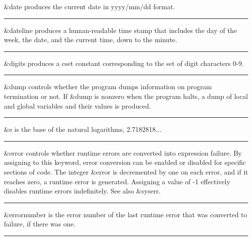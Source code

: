 \noindent
{}\textsf{\&date} produces the current
date in yyyy/mm/dd format.

\bigskip\hrule\vspace{0.1cm}

\noindent
{}\textsf{\&dateline} produces a human-readable time
stamp that includes the day of the week, the date, and the current
time, down to the minute.

\bigskip\hrule\vspace{0.1cm}

\noindent
{}\textsf{\&digits} produces a cset constant
corresponding to the set of digit characters 0-9.

\bigskip\hrule\vspace{0.1cm}

\noindent
\textsf{\&dump} controls whether the program dumps information on
program termination or not. If \textsf{\&dump} is nonzero when the
program halts, a dump of local and global variables and their values is
produced.

\bigskip\hrule\vspace{0.1cm}

\noindent
{}\textsf{\&e} is the base of the natural
logarithms, 2.7182818...

\bigskip\hrule\vspace{0.1cm}

\noindent
{}\textsf{\&error} controls whether
runtime errors are converted into expression failure. By assigning to
this keyword, error conversion can be enabled or disabled for specific
sections of code. The integer \&error is decremented by one on each
error, and if it reaches zero, a runtime error is generated. Assigning
a value of -1 effectively disables runtime errors indefinitely. See
also \textsf{\&syserr}.

\bigskip\hrule\vspace{0.1cm}

\noindent
\textsf{\&errornumber} is the error number of the last runtime error
that was converted to failure, if there was one.

\bigskip\hrule\vspace{0.1cm}

